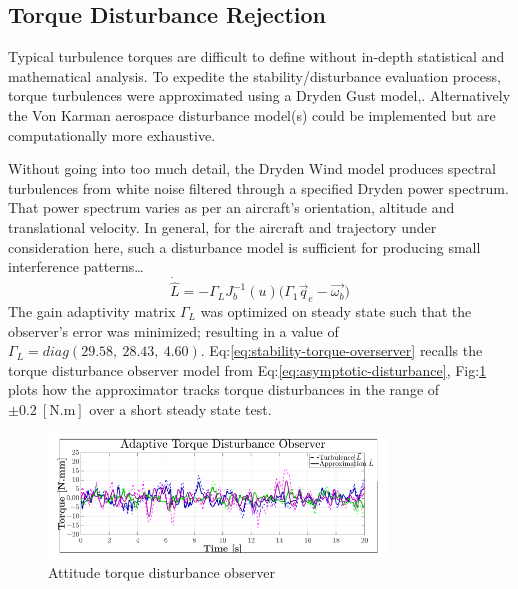 \subsection{Torque Disturbance Rejection}
\label{subsec:simulation.disturbance.torque}
Typical turbulence torques are difficult to define without in-depth statistical and mathematical analysis. To expedite the stability/disturbance evaluation process, torque turbulences were approximated using a Dryden Gust model,\cite{optimalgust,discretegustmodel}. Alternatively the Von Karman aerospace disturbance model(s) could be implemented but are computationally more exhaustive.
\par
Without going into too much detail, the Dryden Wind model produces spectral turbulences from white noise filtered through a specified Dryden power spectrum. That power spectrum varies as per an aircraft's orientation, altitude and translational velocity. In general, for the aircraft and trajectory under consideration here, such a disturbance model is sufficient for producing small interference patterns\ldots
\begin{equation}\label{eq:stability-torque-overserver}
\dot{\hat{L}}=-\Gamma_L J_b^{-1}(u)\big(\Gamma_1\vec{q}_e-\vec{\omega_b}\big)
\end{equation}
The gain adaptivity matrix $\Gamma_L$ was optimized on steady state such that the observer's error was minimized; resulting in a value of $\Gamma_L=diag(29.58,~28.43,~4.60)$. Eq:\ref{eq:stability-torque-overserver} recalls the torque disturbance observer model from Eq:\ref{eq:asymptotic-disturbance}, Fig:\ref{fig:torque-observer} plots how the approximator tracks torque disturbances in the range of $\pm 0.2~[\text{N.m}]$ over a short steady state test. 
\begin{figure}[htbp]
\vspace{-6pt}
\centering
\includegraphics[width=0.8\textwidth]{graphs/torque-observer}
\caption{Attitude torque disturbance observer}
\vspace{-18pt}
\label{fig:torque-observer}
\end{figure}

